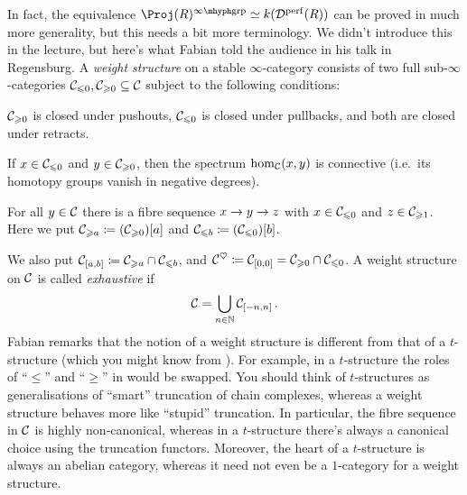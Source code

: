 \documentclass[a4paper, 10pt, oneside, DIV=9, chapterprefix=true, numbers=enddot,bibliography=totoc]{scrbook}
\begin{document}
In fact, the equivalence $\Proj(R)^\inftygrp\simeq k(\Dd^\perf(R))$ can be proved in much more generality, but this needs a bit more terminology.
\label{par:WeightStructure}
We didn't introduce this in the lecture, but here's what Fabian told the audience in his talk in Regensburg. A \emph{weight structure} on a stable $\infty$-category consists of two full sub-$\infty$-categories $\mathcal{C}_{\leqslant 0},\mathcal{C}_{\geqslant 0}\subseteq \mathcal{C}$ subject to the following conditions:
\begin{alphanumerate}
	\item $\mathcal{C}_{\geqslant 0}$ is closed under pushouts, $\mathcal{C}_{\leqslant 0}$ is closed under pullbacks, and both are closed under retracts.
	\item If $x\in \mathcal{C}_{\leqslant 0}$ and $y\in \mathcal{C}_{\geqslant 0}$, then the spectrum $\hom_{\mathcal{C}}(x,y)$ is connective (i.e.\ its homotopy groups vanish in negative degrees).
	\item For all $y\in \mathcal{C}$ there is a fibre sequence $x\morphism y\morphism z$ with $x\in \mathcal{C}_{\leqslant 0}$ and $z\in \mathcal{C}_{\geqslant 1}$. Here we put $\mathcal{C}_{\geqslant a}\coloneqq (\mathcal{C}_{\geqslant 0})[a]$ and $\mathcal{C}_{\leqslant b}\coloneqq (\mathcal{C}_{\leqslant 0})[b]$.
\end{alphanumerate}
We also put $\mathcal{C}_{[a,b]}\coloneqq \mathcal{C}_{\geqslant a}\cap \mathcal{C}_{\leqslant b}$, and $\mathcal{C}^\heartsuit\coloneqq \mathcal{C}_{[0,0]}=\mathcal{C}_{\geqslant 0}\cap \mathcal{C}_{\leqslant 0}$. A weight structure on $\mathcal{C}$ is called \emph{exhaustive} if
\begin{equation*}
	\mathcal{C}=\bigcup_{n\in\mathbb{N}}\mathcal{C}_{[-n,n]}\,.
\end{equation*}
Fabian remarks that the notion of a weight structure is different from that of a $t$-structure (which you might know from \cite[Definition~]{HA}). For example, in a $t$-structure the roles of \enquote{$\leq$} and \enquote{$\geq$} in  would be swapped. You should think of $t$-structures as generalisations of \enquote{smart} truncation of chain complexes, whereas a weight structure behaves more like \enquote{stupid} truncation. In particular, the fibre sequence in $\mathcal{C}$ is highly non-canonical, whereas in a $t$-structure there's always a canonical choice using the truncation functors. Moreover, the heart of a $t$-structure is always an abelian category, whereas it need not even be a $1$-category for a weight structure.
\end{document}
